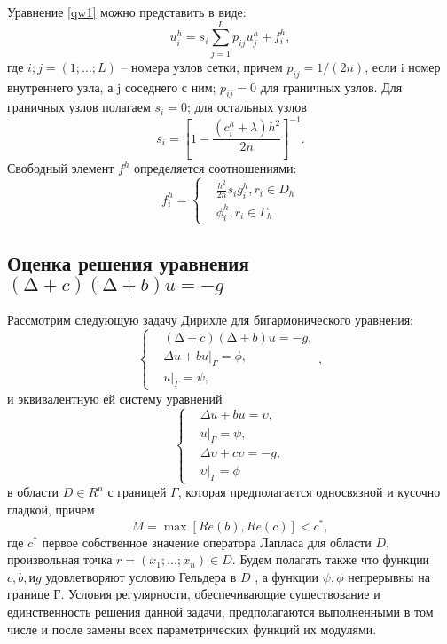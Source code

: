 Уравнение \ref{qw1} можно представить в виде:
\begin{equation}
u^{h}_{i}=s_{i}\sum^{L}_{j=1}{p_{ij}u^{h}_{j}+f^{h}_{i}},
	\label{qw2}
\end{equation} 
где $i; j = (1; \dots; L)$ --  номера узлов сетки, причем $p_{ij} = 1/(2n)$, если i 
номер внутреннего узла, а j  соседнего с ним; $p_{ij} = 0$ для граничных
узлов. Для граничных узлов полагаем $s_{i} = 0$; для остальных узлов
\begin{equation}
s_{i}= 
	\left[
1-\frac{(c^{h}_{i}+\lambda)h^{2}}{2n}
 \right]^{-1}
	\label{qw3}.
\end{equation}
Свободный элемент $f^{h}$ определяется соотношениями:
\begin{equation} f^{h}_{i}= 
	\left\{
\begin{aligned}
& \frac{h^{2}}{2n}s_{i}g^{h}_{i}, r_{i} \in D_{h}\\ & \phi^{h}_{i}, r_{i} \in \Gamma_{h}
\end{aligned}
 \right. 
 \label{qw4}
 \end{equation}
\subsection{Оценка решения уравнения $(∆ + c)(∆ + b)u = -g$}
Рассмотрим следующую задачу Дирихле для бигармонического уравнения: 
\begin{equation} 
	\left\{
\begin{aligned}
& (∆ + c)(∆ + b)u = -g,\\ & \Delta u + bu|_{\Gamma} = \phi, \\ & u|_{\Gamma} = \psi, 
\end{aligned}
 \right. ,\label{qw5}\end{equation}
и эквивалентную ей систему уравнений
\begin{equation} 
	\left\{
\begin{aligned}
&\Delta u + bu =\upsilon, \\ & u|_{\Gamma} = \psi, \\  &\Delta \upsilon + c\upsilon =-g,
\\  & \upsilon|_{\Gamma} = \phi
\end{aligned}
 \right.  \label{qw6}
\end{equation}
в области $D\in R^{n}$ с границей $\Gamma$, которая предполагается односвязной и
кусочно гладкой, причем 
\begin{equation}
	M=\max{[Re(b),Re(c)]} < c^{*},
\end{equation}
где $c^{*}$ первое собственное значение оператора Лапласа для области $D$, произвольная точка $ r = (x_{1}; \dots; x_{n}) \in D$. Будем полагать также что функции $c, b, и g $ удовлетворяют условию Гельдера в $D$ , а функции $ \psi, \phi$ непрерывны на границе Г. Условия регулярности, обеспечивающие существование и единственность решения данной задачи, предполагаются выполненными в том числе и после замены всех параметрических функций их модулями.

